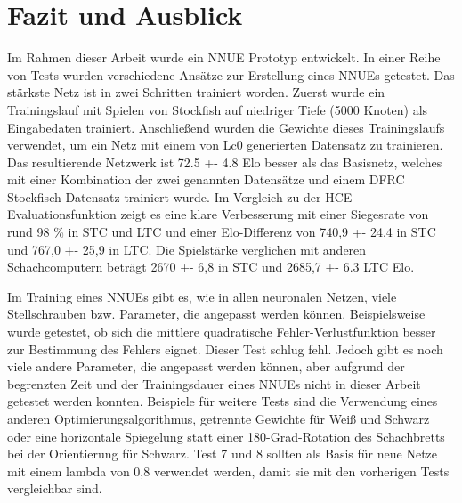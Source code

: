 \chapter{Fazit und Ausblick}

Im Rahmen dieser Arbeit wurde ein \ac{NNUE} Prototyp entwickelt. In einer Reihe von Tests wurden verschiedene Ansätze zur Erstellung eines \acp{NNUE} getestet. Das stärkste Netz ist in zwei Schritten trainiert worden. Zuerst wurde ein Trainingslauf mit Spielen von Stockfish auf niedriger Tiefe (5000 Knoten) als Eingabedaten trainiert. Anschließend wurden die Gewichte dieses Trainingslaufs verwendet, um ein Netz mit einem von \ac{Lc0} generierten Datensatz zu trainieren. Das resultierende Netzwerk ist 72.5 +- 4.8 Elo besser als das Basisnetz, welches mit einer Kombination der zwei genannten Datensätze und einem \ac{DFRC} Stockfisch Datensatz trainiert wurde. Im Vergleich zu der \ac{HCE} Evaluationsfunktion zeigt es eine klare Verbesserung mit einer Siegesrate von rund 98 \% in \ac{STC} und \ac{LTC} und einer Elo-Differenz von 740,9 +- 24,4 in \ac{STC} und 767,0 +- 25,9 in \ac{LTC}. Die Spielstärke verglichen mit anderen Schachcomputern beträgt 2670 +- 6,8 in \ac{STC} und 2685,7 +- 6.3 \ac{LTC} Elo.

Im Training eines \acp{NNUE} gibt es, wie in allen neuronalen Netzen, viele Stellschrauben bzw. Parameter, die angepasst werden können. Beispielsweise wurde getestet, ob sich die mittlere quadratische Fehler-Verlustfunktion besser zur Bestimmung des Fehlers eignet. Dieser Test schlug fehl. Jedoch gibt es noch viele andere Parameter, die angepasst werden können, aber aufgrund der begrenzten Zeit und der Trainingsdauer eines \acp{NNUE} nicht in dieser Arbeit getestet werden konnten. Beispiele für weitere Tests sind \zb{} die Verwendung eines anderen Optimierungsalgorithmus, getrennte Gewichte für Weiß und Schwarz oder eine horizontale Spiegelung statt einer 180-Grad-Rotation des Schachbretts bei der Orientierung für Schwarz. Test 7 und 8 sollten als Basis für neue Netze mit einem lambda von 0,8 verwendet werden, damit sie mit den vorherigen Tests vergleichbar sind.

